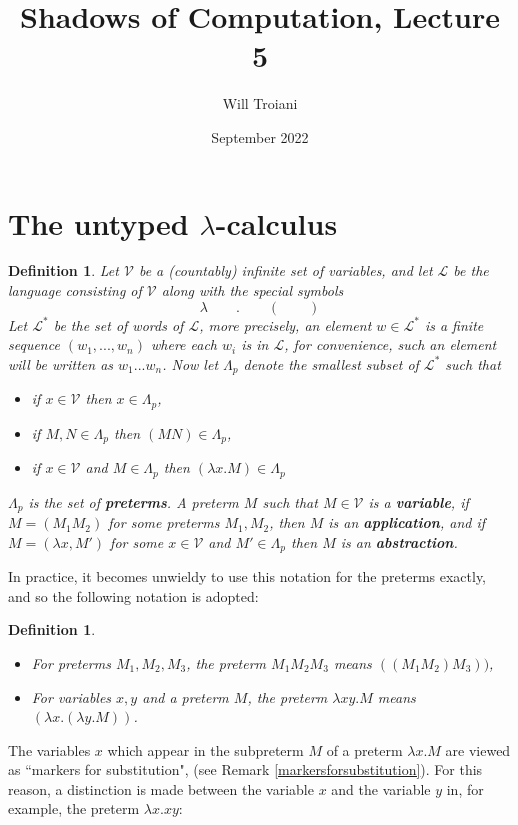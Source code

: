 \documentclass[english,letter paper,12pt,leqno]{article}
\title{Shadows of Computation, Lecture 5}
\author{Will Troiani}
\date{September 2022}
\newcommand{\scr}[1]{\mathscr{#1}}
\newtheorem{defn}[theorem]{Definition}
\theoremstyle{example}
\numberwithin{equation}{section}
\begin{document}
\maketitle

\section{The untyped $\lambda$-calculus}
\begin{defn}
	\label{lambdacalc}
	Let $\scr{V}$ be a (countably) infinite set of variables, and let $\scr{L}$ be the language consisting of $\scr{V}$ along with the special symbols 
	\[\lambda \qquad . \qquad ( \qquad )\]
	Let $\scr{L}^\ast$ be the set of words of $\scr{L}$, more precisely, an element $w \in \scr{L}^\ast$ is a finite sequence $(w_1,...,w_n)$ where each $w_i$ is in $\scr{L}$, for convenience, such an element will be written as $w_1...w_n$. Now let $\Lambda_p$ denote the smallest subset of $\scr{L}^\ast$ such that
	\begin{itemize}
		\item if $x \in \scr{V}$ then $x \in \Lambda_p$,
		\item if $M,N \in \Lambda_p$ then $(MN) \in \Lambda_p$,
		\item if $x \in \scr{V}$ and $M \in \Lambda_p$ then $(\lambda x. M) \in \Lambda_p$
	\end{itemize}
	$\Lambda_p$ is the set of \textbf{preterms}. A preterm $M$ such that $M \in \scr{V}$ is a \textbf{variable}, if $M = (M_1M_2)$ for some preterms $M_1,M_2$, then $M$ is an \textbf{application}, and if $M = (\lambda x, M')$ for some $x \in \scr{V}$ and $M' \in \Lambda_p$ then $M$ is an \textbf{abstraction}.
\end{defn}
In practice, it becomes unwieldy to use this notation for the preterms exactly, and so the following notation is adopted:
\begin{defn}
	\begin{itemize}
		\item For preterms $M_1,M_2,M_3$, the preterm $M_1M_2M_3$ means $((M_1M_2)M_3))$,
		\item For variables $x,y$ and a preterm $M$, the preterm $\lambda xy. M$ means $(\lambda x. (\lambda y. M))$.
	\end{itemize}
\end{defn}
The variables $x$ which appear in the subpreterm $M$ of a preterm $\lambda x. M$ are viewed as ``markers for substitution", (see Remark \ref{markersforsubstitution}). For this reason, a distinction is made between the variable $x$ and the variable $y$ in, for example, the preterm $\lambda x. xy$:
\end{document}

